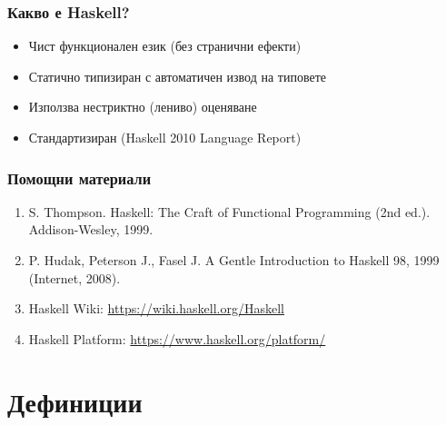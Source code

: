 \documentclass[alsotrans]{beamerswitch}
\begin{document}
\lstset{basicstyle=\ttfamily}

\begin{frame}
  \frametitle{Какво е Haskell?}

  \pause
  \begin{itemize}
  \item Чист функционален език (без странични ефекти)
  \item Статично типизиран с автоматичен извод на типовете
  \item Използва нестриктно (лениво) оценяване
  \item Стандартизиран (Haskell 2010 Language Report)
  \end{itemize}
\end{frame}

\begin{frame}
  \frametitle{Помощни материали}

  \begin{enumerate}
  \item S. Thompson. Haskell: The Craft of Functional Programming (2nd ed.). Addison-Wesley, 1999.
  \item P. Hudak, Peterson J., Fasel J. A Gentle Introduction to Haskell 98, 1999 (Internet, 2008).
  \item Haskell Wiki: \url{https://wiki.haskell.org/Haskell}
  \item Haskell Platform: \url{https://www.haskell.org/platform/}
  \end{enumerate}
\end{frame}

\section{Дефиниции}
\end{document}
